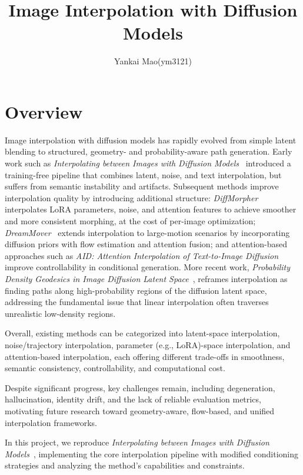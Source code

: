 \documentclass{article}
\title{Image Interpolation with Diffusion Models}
\author{Yankai Mao(ym3121)}
\begin{document}
\maketitle


\section{Overview}
Image interpolation with diffusion models has rapidly evolved from simple latent blending to structured, geometry- and probability-aware path generation. Early work such as \textit{Interpolating between Images with Diffusion Models}~\cite{wang2023interpolating} introduced a training-free pipeline that combines latent, noise, and text interpolation, but suffers from semantic instability and artifacts. Subsequent methods improve interpolation quality by introducing additional structure: \textit{DiffMorpher}~\cite{zhang2023diffmorpher} interpolates LoRA parameters, noise, and attention features to achieve smoother and more consistent morphing, at the cost of per-image optimization; \textit{DreamMover}~\cite{xing2024dreammover} extends interpolation to large-motion scenarios by incorporating diffusion priors with flow estimation and attention fusion; and attention-based approaches such as \textit{AID: Attention Interpolation of Text-to-Image Diffusion}~\cite{li2024aid} improve controllability in conditional generation. More recent work, \textit{Probability Density Geodesics in Image Diffusion Latent Space}~\cite{chen2025geodesic}, reframes interpolation as finding paths along high-probability regions of the diffusion latent space, addressing the fundamental issue that linear interpolation often traverses unrealistic low-density regions. 

Overall, existing methods can be categorized into latent-space interpolation, noise/trajectory interpolation, parameter (e.g., LoRA)-space interpolation, and attention-based interpolation, each offering different trade-offs in smoothness, semantic consistency, controllability, and computational cost. 

Despite significant progress, key challenges remain, including degeneration, hallucination, identity drift, and the lack of reliable evaluation metrics, motivating future research toward geometry-aware, flow-based, and unified interpolation frameworks.

In this project, we reproduce \textit{Interpolating between
  Images with Diffusion Models}~\cite{wang2023interpolating},
  implementing the core interpolation pipeline with modified
  conditioning strategies and analyzing the method's capabilities
  and constraints.
\end{document}
